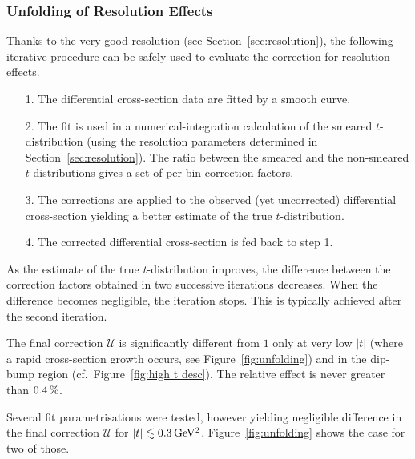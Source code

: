 
\subsubsection{Unfolding of Resolution Effects}
\label{sec:unfolding}

Thanks to the very good resolution (see Section~\ref{sec:resolution}), the following iterative procedure can be safely used to evaluate the correction for resolution effects.
\begin{itemize}
\item[1.] The differential cross-section data are fitted by a smooth curve.
\item[2.] The fit is used in a numerical-integration calculation of the smeared $t$-distribution (using the resolution parameters determined in Section~\ref{sec:resolution}). The ratio between the smeared and the non-smeared $t$-distributions gives a set of per-bin correction factors.
\item[3.] The corrections are applied to the observed (yet uncorrected) differential cross-section yielding a better estimate of the true $t$-distribution.
\item[4.] The corrected differential cross-section is fed back to step 1.
\end{itemize}
As the estimate of the true $t$-distribution improves, the difference between the correction factors obtained in two successive iterations decreases. When the difference becomes negligible, the iteration stops. This is typically achieved after the second iteration. 

The final correction $\mathcal{U}$ is significantly different from $1$ only at very low $|t|$ (where a rapid cross-section growth occurs, see Figure~\ref{fig:unfolding}) and in the dip-bump region (cf.~Figure~\ref{fig:high t desc}). The relative effect is never greater than $0.4\,{\rm \%}$.

Several fit parametrisations were tested, however yielding negligible difference in the final correction $\mathcal{U}$ for $|t| \lesssim 0.3\,{\rm GeV^2}$. Figure~\ref{fig:unfolding} shows the case for two of those.

